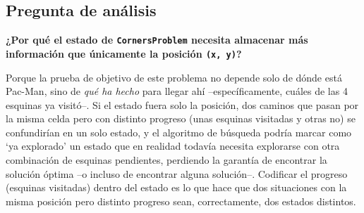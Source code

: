 \subsection{Pregunta de análisis}

\textbf{¿Por qué el estado de \texttt{CornersProblem} necesita almacenar más información que
únicamente la posición \texttt{(x, y)}?}

Porque la prueba de objetivo de este problema no depende solo de dónde está Pac-Man, sino de
\emph{qué ha hecho} para llegar ahí --específicamente, cuáles de las 4 esquinas ya visitó--. Si el
estado fuera solo la posición, dos caminos que pasan por la misma celda pero con distinto progreso
(unas esquinas visitadas y otras no) se confundirían en un solo estado, y el algoritmo de búsqueda
podría marcar como `ya explorado' un estado que en realidad todavía necesita explorarse con otra
combinación de esquinas pendientes, perdiendo la garantía de encontrar la solución óptima --o
incluso de encontrar alguna solución--. Codificar el progreso (esquinas visitadas) dentro del
estado es lo que hace que dos situaciones con la misma posición pero distinto progreso sean,
correctamente, dos estados distintos.
